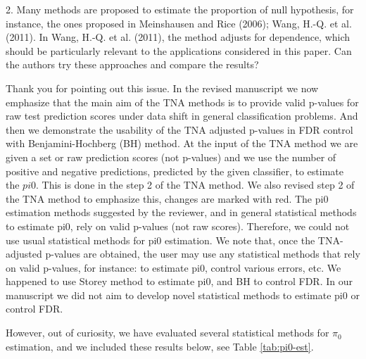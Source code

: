 \documentclass{article}
\newcommand{\response}[1]{\vspace*{1ex} \color{blue} \noindent #1 \color{black}
\vspace*{2ex}}
\begin{document}
2. Many methods are proposed to estimate the proportion of null hypothesis, for instance, the ones proposed in Meinshausen and Rice (2006); Wang, H.-Q. et al. (2011). In Wang, H.-Q. et al. (2011), the method adjusts for dependence, which should be particularly relevant to the applications considered in this paper. Can the authors try these approaches and compare the results?


\response{Thank you for pointing out this issue. In the revised manuscript we now emphasize that the main aim of the TNA methods is to provide valid p-values for raw test prediction scores under data shift in general classification problems. And then we demonstrate the usability of the TNA adjusted p-values in FDR control with Benjamini-Hochberg (BH) method. At the input of the TNA method we are given a set or raw prediction scores (not p-values) and we use the number of positive and negative predictions, predicted by the given classifier, to estimate the $pi0$. This is done in the step 2 of the TNA method. We also revised step 2 of the TNA method to emphasize this, changes are marked with red. The pi0 estimation methods suggested by the reviewer, and in general statistical methods to estimate pi0, rely on valid p-values (not raw scores). Therefore, we could not use usual statistical methods for pi0 estimation. We note that, once the TNA-adjusted p-values are obtained, the user may use any statistical methods that rely on valid p-values, for instance: to estimate pi0, control various errors, etc. We happened to use Storey method to estimate pi0, and BH to control FDR. In our manuscript we did not aim to develop novel statistical methods to estimate pi0 or control FDR. 
	
However, out of curiosity, we have evaluated several statistical methods for $\pi_0$ estimation, and we included these results below, see Table \ref{tab:pi0-est}.}
\end{document}
